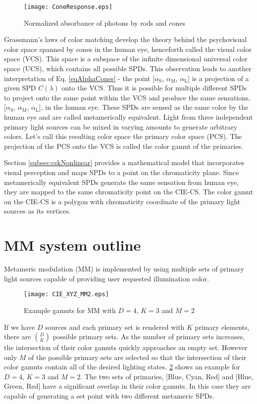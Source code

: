 \begin{figure}[!t]
	\centering
    \texttt{[image: ConeResponse.eps]}
	\caption[Normalized absorbance of photons by rods and cones]{Normalized absorbance of photons by rods and cones \cite{wan96a}}
	\label{figConeResp}
\end{figure}

Grassmann's laws \cite{gra54a} of color matching develop the theory behind the psychovisual color space spanned by cones in the human eye, henceforth called the visual color space (VCS).  This space is a subspace  of the infinite dimensional universal color space (UCS), which contains all possible SPDs. This observation leads to another interpretation of Eq. \eqref{eqAlphaCones} - the point $[{\alpha}_{\text{S}}$, ${\alpha}_{\text{M}}$, ${\alpha}_{\text{L}}]$ is a projection of a given SPD $C(\lambda)$ onto the VCS. Thus it is possible for multiple different SPDs to project onto the same point within the VCS and produce the same sensations, $[{\alpha}_{\text{S}}$, ${\alpha}_{\text{M}}$, ${\alpha}_{\text{L}}]$, in the human eye. These SPDs are sensed as the same color by the human eye and are called metamerically equivalent. Light from three independent primary light sources can be mixed in varying amounts to generate arbitrary colors. Let's call this resulting color space the primary color space (PCS). The projection of the PCS onto the VCS is called the color gamut of the primaries.

Section \ref{subsec:cskNonlinear} provides a mathematical model that incorporates visual perception and maps SPDs to a point on the chromaticity plane. Since metamerically equivalent SPDs generate the same sensation from human eye, they are mapped to the same chromaticity point on the CIE-CS. The color gamut on the CIE-CS is a polygon with chromaticity coordinate of the primary light sources as its vertices.

\section{MM system outline}
\label{subsec:metamericMM}
Metameric modulation (MM) is implemented by using multiple sets of primary light sources capable of providing user requested illumination color.
\begin{figure}[!t]
	\centering
    \texttt{[image: CIE\_XYZ\_MM2.eps]}
	\caption{Example gamuts for MM with $D=4$, $K=3$ and $M=2$}
	\label{figCIEXYZMM}
\end{figure}
If we have $D$ sources and each primary set is rendered with $K$ primary elements, there are $\binom{D}{K}$ possible primary sets. As the number of primary sets increases, the intersection of their color gamuts quickly approaches an empty set. However only $M$ of the possible primary sets are selected so that the intersection of their color gamuts contain all of the desired lighting states. \figurename{ \ref{figCIEXYZMM}} shows an example for $D=4$, $K=3$ and $M=2$. The two sets of primaries, [Blue, Cyan, Red] and [Blue, Green, Red] have a significant overlap in their color gamuts. In this case they are capable of generating a set point with two different metameric SPDs. 

